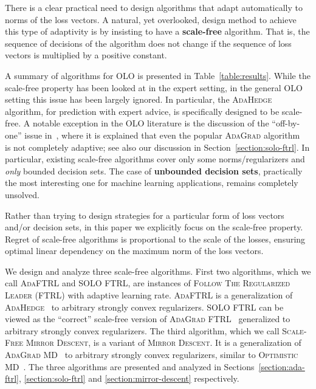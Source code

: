 
There is a clear practical need to design algorithms that adapt automatically
to norms of the loss vectors.  A natural, yet overlooked, design method to
achieve this type of adaptivity is by insisting to have a \textbf{scale-free}
algorithm.  That is, the sequence of decisions of the algorithm does not change
if the sequence of loss vectors is multiplied by a positive constant.

A summary of algorithms for OLO is presented in Table~\ref{table:results}.
While the scale-free property has been looked at in the expert setting, in the
general OLO setting this issue has been largely ignored.  In particular, the
\textsc{AdaHedge}~\cite{de-Rooij-van-Erven-Grunwald-Koolen-2014} algorithm, for
prediction with expert advice, is specifically designed to be scale-free.  A
notable exception in the OLO literature is the discussion of the ``off-by-one''
issue in~\cite{McMahan-2014}, where it is explained that even the popular
\textsc{AdaGrad} algorithm~\cite{Duchi-Hazan-Singer-2011} is not completely
adaptive; see also our discussion in Section~\ref{section:solo-ftrl}. In
particular, existing scale-free algorithms cover only some norms/regularizers
and \emph{only} bounded decision sets. The case of \textbf{unbounded decision
sets}, practically the most interesting one for machine learning applications,
remains completely unsolved.

Rather than trying to design strategies for a particular form of loss vectors
and/or decision sets, in this paper we explicitly focus on the scale-free
property. Regret of scale-free algorithms is proportional to the scale of the
losses, ensuring optimal linear dependency on the maximum norm of the loss
vectors.

We design and analyze three scale-free algorithms. First two algorithms, which
we call \textsc{AdaFTRL} and \textsc{SOLO FTRL}, are instances of
\textsc{Follow The Regularized Leader} (\textsc{FTRL}) with adaptive learning
rate.  \textsc{AdaFTRL} is a generalization of
\textsc{AdaHedge}~\cite{de-Rooij-van-Erven-Grunwald-Koolen-2014} to arbitrary
strongly convex regularizers.  \textsc{SOLO FTRL} can be viewed as the
``correct'' scale-free version of \textsc{AdaGrad
FTRL}~\cite{Duchi-Hazan-Singer-2011} generalized to arbitrary strongly convex
regularizers.  The third algorithm, which we call \textsc{Scale-Free Mirror
Descent}, is a variant of \textsc{Mirror Descent}. It is a generalization of
\textsc{AdaGrad MD}~\cite{Duchi-Hazan-Singer-2011} to arbitrary strongly convex
regularizers, similar to \textsc{Optimistic MD}~\cite{Rakhlin-Sridharan-2013}.
The three algorithms are presented and analyzed in
Sections~\ref{section:ada-ftrl}, \ref{section:solo-ftrl} and
\ref{section:mirror-descent} respectively.

